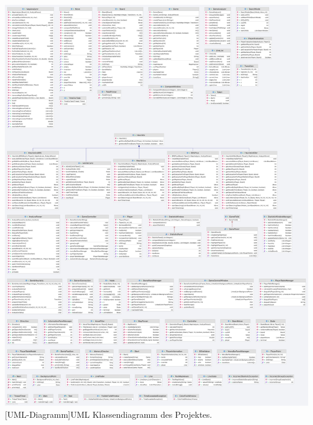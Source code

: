 \begin{minipage}{\linewidth}
    \centering
    \includegraphics[width=0.95\linewidth]{pics/uml-diagrams}
    [UML-Diagramm]{UML Klassendiagramm des Projektes.}
    \label{fig:uml-diagram}
\end{minipage}


\bigskip
\newpage